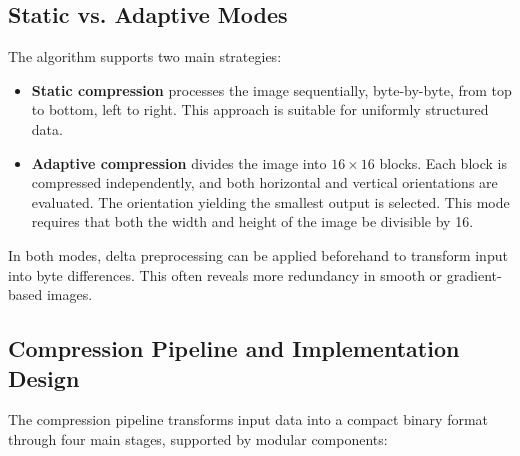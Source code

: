 \documentclass[a4paper,12pt]{article}
\begin{document}
    \subsection*{Static vs. Adaptive Modes}

    The algorithm supports two main strategies:

    \begin{itemize}
        \item \textbf{Static compression} processes the image sequentially, byte-by-byte, from top to bottom, left to right. This approach is suitable for uniformly structured data.

        \item \textbf{Adaptive compression} divides the image into $16 \times 16$ blocks. Each block is compressed independently, and both horizontal and vertical orientations are evaluated. The orientation yielding the smallest output is selected. This mode requires that both the width and height of the image be divisible by 16.
    \end{itemize}

    In both modes, delta preprocessing can be applied beforehand to transform input into byte differences. This often reveals more redundancy in smooth or gradient-based images.

    \subsection*{Compression Pipeline and Implementation Design}

    The compression pipeline transforms input data into a compact binary format through four main stages, supported by modular components:
\end{document}
